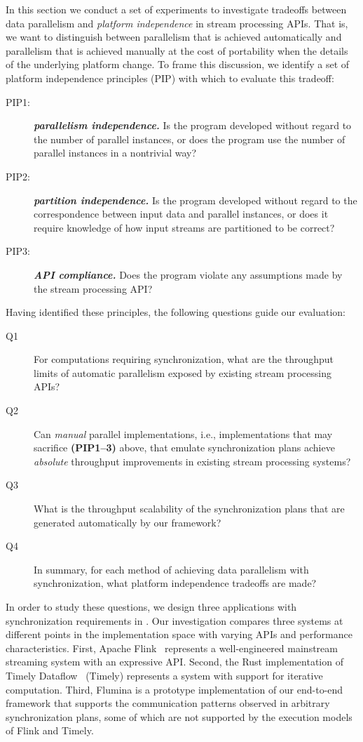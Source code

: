 In this section we conduct a set of experiments to investigate tradeoffs between data parallelism and \emph{platform independence} in stream processing APIs.
That is, we want to distinguish between parallelism that is achieved automatically and parallelism that is achieved manually at the cost of portability when the details of the underlying platform change.
To frame this discussion,
we identify a set of platform independence principles (PIP) with which to evaluate this tradeoff:
\begin{description}
\item[PIP1:] \textbf{\emph{parallelism independence.}}
    Is the program developed without regard to the number of parallel instances, or does the program use the number of parallel instances in a nontrivial way?
\item[PIP2:] \textbf{\emph{partition independence.}}
    Is the program developed without regard to the correspondence between input data and parallel instances, or does it require knowledge of how input streams are partitioned to be correct?
\item[PIP3:] \textbf{\emph{API compliance.}}
    Does the program violate any assumptions made by the stream processing API?
\end{description}
Having identified these principles, the following questions guide our evaluation:
\begin{description}
\item[Q1]
For computations requiring synchronization, what are the throughput limits of automatic parallelism exposed by existing stream processing APIs?
\item[Q2]
Can \emph{manual} parallel implementations, i.e., implementations that may sacrifice \textbf{(PIP1--3)} above, that emulate synchronization plans
achieve \emph{absolute} throughput improvements in existing stream processing systems?
\item[Q3]
What is the throughput scalability of the synchronization plans that are generated automatically by our framework?
\item[Q4]
In summary, for each method of achieving data parallelism with synchronization, what platform independence tradeoffs are made?
\end{description}
In order to study these questions, we design three applications with synchronization requirements in .
Our investigation compares three systems at different points
in the implementation space with varying APIs and performance characteristics.
First,
Apache Flink~\cite{Flink,carbone2015flink} represents a well-engineered mainstream streaming system with an expressive API.
Second, the Rust implementation of Timely Dataflow~\cite{Timely,murray2013naiad} (Timely) represents a system with support for iterative computation.
Third, Flumina is a prototype implementation of our end-to-end framework that supports the communication patterns observed in arbitrary synchronization plans,
some of which are not supported by the execution models of Flink and Timely.

